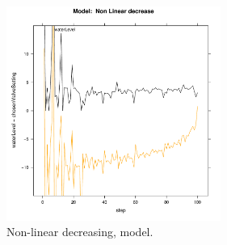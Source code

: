 \documentclass[twocolumn]{article}
\begin{document}
\begin{figure}[p]
\includegraphics[width=7cm]{nd_model.pdf}
\caption{Non-linear decreasing, model.}
\label{nd.model}
\end{figure}
\end{document}
